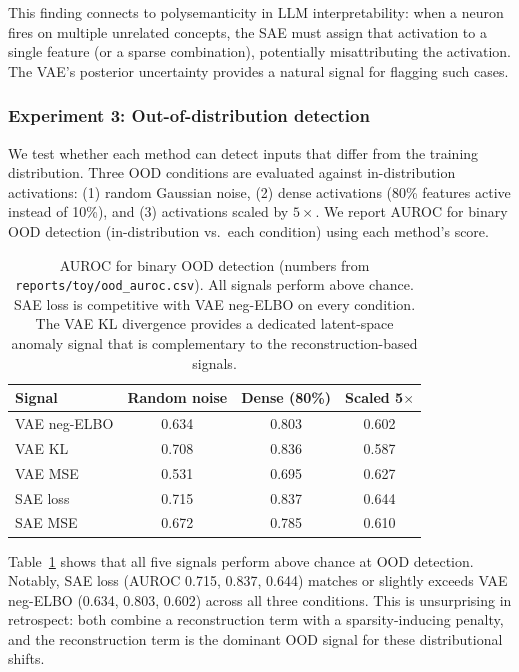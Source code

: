 \documentclass{article}
\begin{document}
This finding connects to polysemanticity in LLM interpretability: when a neuron fires on multiple unrelated concepts, the SAE must assign that activation to a single feature (or a sparse combination), potentially misattributing the activation. The VAE's posterior uncertainty provides a natural signal for flagging such cases.

\subsubsection{Experiment 3: Out-of-distribution detection}

We test whether each method can detect inputs that differ from the training distribution. Three OOD conditions are evaluated against in-distribution activations: (1) random Gaussian noise, (2) dense activations (80\% features active instead of 10\%), and (3) activations scaled by $5\times$. We report AUROC for binary OOD detection (in-distribution vs.\ each condition) using each method's score.

\begin{table}[t]
  \caption{AUROC for binary OOD detection (numbers from \texttt{reports/toy/ood\_auroc.csv}). All signals perform above chance. SAE loss is competitive with VAE neg-ELBO on every condition. The VAE KL divergence provides a dedicated latent-space anomaly signal that is complementary to the reconstruction-based signals.}
  \label{tab:ood}
  \centering
  \begin{tabular}{lccc}
    \toprule
    Signal & Random noise & Dense (80\%) & Scaled 5$\times$ \\
    \midrule
    VAE neg-ELBO & 0.634 & 0.803 & 0.602 \\
    VAE KL       & 0.708 & 0.836 & 0.587 \\
    VAE MSE      & 0.531 & 0.695 & 0.627 \\
    SAE loss     & 0.715 & 0.837 & 0.644 \\
    SAE MSE      & 0.672 & 0.785 & 0.610 \\
    \bottomrule
  \end{tabular}
\end{table}

Table~\ref{tab:ood} shows that all five signals perform above chance at OOD detection. Notably, SAE loss (AUROC 0.715, 0.837, 0.644) matches or slightly exceeds VAE neg-ELBO (0.634, 0.803, 0.602) across all three conditions. This is unsurprising in retrospect: both combine a reconstruction term with a sparsity-inducing penalty, and the reconstruction term is the dominant OOD signal for these distributional shifts.
\end{document}
